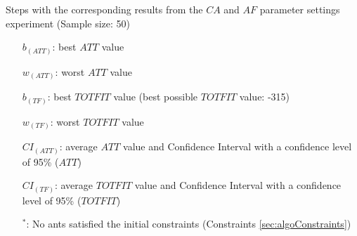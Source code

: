 \begin{sidewaystable}
    \caption {Steps with the corresponding results from the $CA$ and $AF$ parameter settings experiment (Sample size: 50)}
    \tiny
    \begin{itemize}[noitemsep]
    \item[$b_{(ATT)}$:] best $ATT$ value
    \item[$w_{(ATT)}$:] worst $ATT$ value
    \item[$b_{(TF)}$:] best $TOTFIT$ value (best possible $TOTFIT$ value: -315)
    \item[$w_{(TF)}$:] worst $TOTFIT$ value
    \item[$CI_{(ATT)}$:] average $ATT$ value and Confidence Interval with a confidence level of 95\% ($ATT$)
    \item[$CI_{(TF)}$:] average $TOTFIT$ value and Confidence Interval with a confidence level of 95\% ($TOTFIT$)
    \item[$^*$:] No ants satisfied the initial constraints (Constraints \vref{sec:algoConstraints})
    \end{itemize}
    \label{table:pm2}
\end{sidewaystable}



